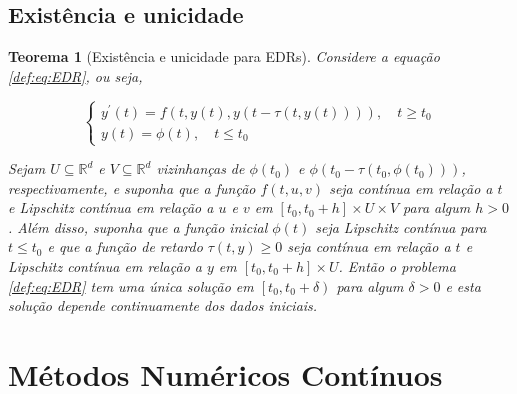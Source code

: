 \documentclass{beamer}
\theoremstyle{plain}
\newtheorem{teo}{Teorema}
\theoremstyle{definition}
\begin{document}
\subsection{Existência e unicidade}
\begin{frame}
     
\begin{teo}[Existência e unicidade para EDRs]
  \label{teo:local_existence:EDR}
  \small
  Considere a equação \eqref{def:eq:EDR}, ou seja,

  \[
    \left\{\begin{array}{l}
        y^{\prime}(t)=f(t, y(t), y(t-\tau(t, y(t)))), \quad t \geq t_{0}  \\
        y(t)=\phi(t), \quad t \leq t_{0}
    \end{array}\right.
  \]

  Sejam \(U \subseteq \mathbb{R}^{d}\) e \(V \subseteq \mathbb{R}^{d}\) vizinhanças de \(\phi\left(t_{0}\right)\) e \(\phi\left(t_{0}-\tau\left(t_{0}, \phi\left(t_{0}\right)\right)\right)\), respectivamente, e suponha que a função \(f(t, u, v)\) seja contínua em relação a \(t\) e Lipschitz contínua em relação a \(u\) e \(v\) em \(\left[t_{0}, t_{0}+h\right] \times U \times V\) para algum \(h>0\). Além disso, suponha que a função inicial \(\phi(t)\) seja Lipschitz contínua para \(t \leq t_{0}\) e que a função de retardo \(\tau(t, y) \geq 0\) seja contínua em relação a \(t\) e Lipschitz contínua em relação a \(y\) em \(\left[t_{0}, t_{0}+h\right] \times U\). Então o problema \ref{def:eq:EDR} tem uma única solução em \(\left[t_{0}, t_{0}+\delta\right)\) para algum \(\delta>0\) e esta solução depende continuamente dos dados iniciais.

\end{teo}
\end{frame}


\section{Métodos Numéricos Contínuos}

%
\end{document}
